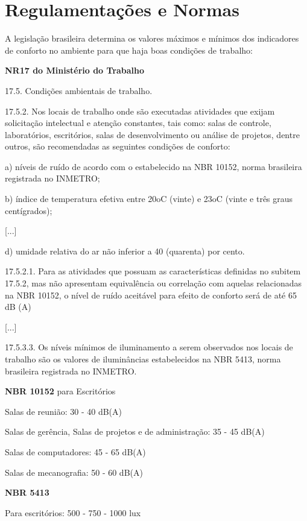 \documentclass[]{politex}
\begin{document}
\section{Regulamentações e Normas} %

A legislação brasileira determina os valores máximos e mínimos dos indicadores de conforto no ambiente para que haja boas condições de trabalho: 

\begin{citacaoLonga} %
\textbf{NR17 do Ministério do Trabalho} \cite{NR17}

17.5. Condições ambientais de trabalho.

17.5.2. Nos locais de trabalho onde são executadas atividades que exijam solicitação intelectual e atenção constantes, tais como: salas de controle, laboratórios, escritórios, salas de desenvolvimento ou análise de projetos, dentre outros, são recomendadas as seguintes condições de conforto:

a) níveis de ruído de acordo com o estabelecido na NBR 10152, norma brasileira registrada no INMETRO;

b) índice de temperatura efetiva entre 20oC (vinte) e 23oC (vinte e três graus centígrados);

[...]

d) umidade relativa do ar não inferior a 40 (quarenta) por cento.

17.5.2.1. Para as atividades que possuam as características definidas no subitem 17.5.2, mas não apresentam equivalência ou correlação com aquelas relacionadas na NBR 10152, o nível de ruído aceitável para efeito de conforto será de até 65 dB (A)

[...]

17.5.3.3. Os níveis mínimos de iluminamento a serem observados nos locais de trabalho são os valores de iluminâncias estabelecidos na NBR 5413, norma brasileira registrada no INMETRO.
\end{citacaoLonga}

\begin{citacaoLonga} %

\textbf{NBR 10152} \cite{NBR10152} para Escritórios

Salas de reunião: 30 - 40 dB(A)

Salas de gerência, Salas de projetos e de administração: 35 - 45 dB(A)

Salas de computadores: 45 - 65 dB(A)

Salas de mecanografia: 50 - 60 dB(A)

\textbf{NBR 5413} \cite{NBR5413}

Para escritórios: 500 - 750 - 1000 lux
\end{citacaoLonga}
\end{document}
